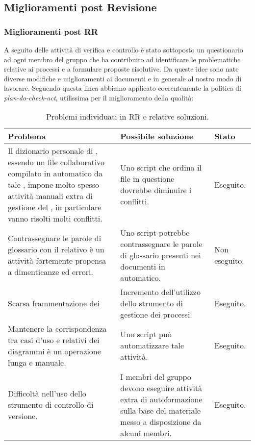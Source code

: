 	
	 \pagebreak
	 \subsection{Miglioramenti post Revisione}
	 
	 	\subsubsection{Miglioramenti post RR}
		A seguito delle attività di verifica e controllo è stato sottoposto un questionario ad ogni membro del gruppo che ha contribuito ad identificare le problematiche relative ai processi e a formulare proposte risolutive. Da queste idee sono nate diverse modifiche e miglioramenti ai documenti e in generale al nostro modo di lavorare. Seguendo questa linea abbiamo applicato coerentemente la politica di \textit{plan-do-check-act}, utilissima per il miglioramento della qualità: \\
			

		\begin{table}[H]
	    \begin{tabular}{ | p{5cm} | p{5cm} | p{2cm} | }
			\hline
			Problema & Possibile soluzione & Stato \\ \hline
		    Il dizionario personale di \glossario{Aspell}, essendo un file collaborativo compilato in automatico da tale \glossario{tool}, impone molto spesso attività manuali extra di gestione del \glossario{repository}, in particolare vanno risolti molti conflitti. & Uno script che ordina il file in questione dovrebbe diminuire i conflitti. & Eseguito. \\ \hline
			 Contrassegnare le parole di glossario con il relativo \glossario{tag} è un attività fortemente propensa a dimenticanze ed errori. & Uno script potrebbe contrassegnare le parole di glossario presenti nei documenti in automatico. & Non eseguito.  \\ \hline
			Scarsa frammentazione dei \glossario{task} & Incremento dell'utilizzo dello strumento di gestione dei processi. & Eseguito.   \\ \hline
			Mantenere la corrispondenza tra casi d'uso e relativi \glossario{url} dei diagrammi è un operazione lunga e manuale. & Uno script può automatizzare tale attività. & Eseguito. \\ \hline
			Difficoltà nell'uso dello strumento di controllo di versione. & I membri del gruppo devono eseguire attività extra di autoformazione sulla base del materiale messo a disposizione da alcuni membri. & Eseguito. \\	
			\hline
	    \end{tabular}
	    	\caption{Problemi individuati in RR e relative soluzioni.}
		\end{table}

